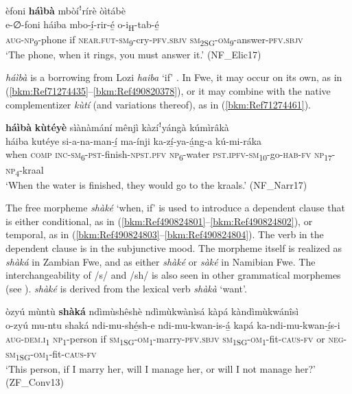 \ea
\label{bkm:Ref490820378}
èfoni \textbf{háìbà} mbòíꜝrírè òìtábè\\
\gll e-∅-foni    háiba  mbo-í̲-rir-é̲ o-i\textsubscript{H}-tab-é̲ \\
\textsc{aug}-\textsc{np}\textsubscript{9}-phone  if  \textsc{near}.\textsc{fut}-\textsc{sm}\textsubscript{9}-cry-\textsc{pfv}.\textsc{sbjv}
\textsc{sm}\textsubscript{2SG}-\textsc{om}\textsubscript{9}-answer-\textsc{pfv}.\textsc{sbjv}\\
\glt ‘The phone, when it rings, you must answer it.’ (NF\_Elic17)
\z

\textit{háìbà} is a borrowing from Lozi \textit{haiba} ‘if’ \citep[78]{Burger1960}. In Fwe, it may occur on its own, as in (\ref{bkm:Ref71274435}--\ref{bkm:Ref490820378}), or it may combine with the native complementizer \textit{kùtí} (and variations thereof), as in (\ref{bkm:Ref71274461}).

\ea
\label{bkm:Ref71274461}
\textbf{háìbà} \textbf{kùtéyè} sìànàmání mênjì kàzíꜝyángà kúmìrâkà\\
\gll háiba  kutéye    si-a-na-man-í̲      ma-ínji ka-zí̲-ya-á̲ng-a    kú-mi-ráka\\
when  \textsc{comp}    \textsc{inc}-\textsc{sm}\textsubscript{6}-\textsc{pst}-finish-\textsc{npst}.\textsc{pfv}  \textsc{np}\textsubscript{6}-water
\textsc{pst}.\textsc{ipfv}-\textsc{sm}\textsubscript{10}-go-\textsc{hab}-\textsc{fv}  \textsc{np}\textsubscript{17}-\textsc{np}\textsubscript{4}-kraal\\
\glt ‘When the water is finished, they would go to the kraals.’ (NF\_Narr17)
\z

The free morpheme \textit{shàké} ‘when, if’ is used to introduce a dependent clause that is either conditional, as in (\ref{bkm:Ref490824801}--\ref{bkm:Ref490824802}), or temporal, as in (\ref{bkm:Ref490824803}--\ref{bkm:Ref490824804}). The verb in the dependent clause is in the subjunctive mood. The morpheme itself is realized as \textit{shàká} in Zambian Fwe, and as either \textit{shàké} or \textit{sàké} in Namibian Fwe. The interchangeability of /s/ and /sh/ is also seen in other grammatical morphemes (see ). \textit{shàké} is derived from the lexical verb \textit{shàkà} ‘want’.

\newpage
\ea
\label{bkm:Ref490824801}
òzyú mùntù \textbf{shàká} ndìmùshêshè ndìmùkwànìsá kàpá kàndìmùkwánîsì\\
\gll o-zyú    mu-ntu  shaká  ndi-mu-shé̲sh-e ndi-mu-kwan-is-á̲    kapá  ka-ndi-mu-kwan-í̲s-i\\
\textsc{aug}-\textsc{dem}.\textsc{i}\textsubscript{1} \textsc{np}\textsubscript{1}-person  if  \textsc{sm}\textsubscript{1SG}-\textsc{om}\textsubscript{1}-marry-\textsc{pfv}.\textsc{sbjv}
\textsc{sm}\textsubscript{1SG}-\textsc{om}\textsubscript{1}-fit-\textsc{caus}-\textsc{fv}  or  \textsc{neg}-\textsc{sm}\textsubscript{1SG}-\textsc{om}\textsubscript{1}-fit-\textsc{caus}-\textsc{fv}\\
\glt ‘This person, if I marry her, will I manage her, or will I not manage her?’ (ZF\_Conv13)
\z

